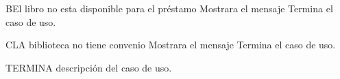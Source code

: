 		\begin{UCtrayectoriaA}{B}{El libro no esta disponible para el préstamo}
			\UCpaso[\UCsist] Mostrara el mensaje 
			\UCpaso[\UCsist] Termina el caso de uso.
		\end{UCtrayectoriaA}
		
		\begin{UCtrayectoriaA}{C}{LA biblioteca no tiene convenio}
			\UCpaso[\UCsist] Mostrara el mensaje 
			\UCpaso[\UCsist] Termina el caso de uso.
		\end{UCtrayectoriaA}
TERMINA descripción del caso de uso.
